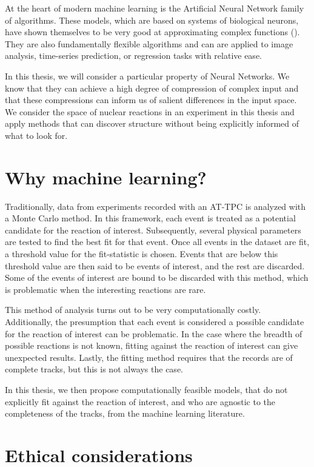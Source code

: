 At the heart of modern machine learning is the Artificial Neural Network family of algorithms. These models, which are based on systems of biological neurons, have shown themselves to be very good at approximating complex functions (\cite{Lin2017}). They are also fundamentally flexible algorithms and can are applied to image analysis, time-series prediction, or regression tasks with relative ease.

In this thesis, we will consider a particular property of Neural Networks. We know that they can achieve a high degree of compression of complex input and that these compressions can inform us of salient differences in the input space. We consider the space of nuclear reactions in an experiment in this thesis and apply methods that can discover structure without being explicitly informed of what to look for.

\section{Why machine learning?}

Traditionally, data from experiments recorded with an AT-TPC is analyzed with a Monte Carlo method. In this framework, each event is treated as a potential candidate for the reaction of interest. Subsequently, several physical parameters are tested to find the best fit for that event. Once all events in the dataset are fit, a threshold value for the fit-statistic is chosen. Events that are below this threshold value are then said to be events of interest, and the rest are discarded. Some of the events of interest are bound to be discarded with this method, which is problematic when the interesting reactions are rare. 

This method of analysis turns out to be very computationally costly. Additionally, the presumption that each event is considered a possible candidate for the reaction of interest can be problematic. In the case where the breadth of possible reactions is not known, fitting against the reaction of interest can give unexpected results. Lastly, the fitting method requires that the records are of complete tracks, but this is not always the case.

In this thesis, we then propose computationally feasible models, that do not explicitly fit against the reaction of interest, and who are agnostic to the completeness of the tracks, from the machine learning literature.

\section{Ethical considerations}

